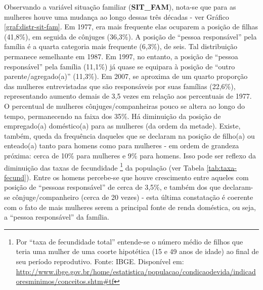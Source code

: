 Observando a variável situação familiar (\textbf{SIT_FAM}), nota-se que para as mulheres houve uma mudança ao longo dessas três décadas - ver Gráfico \ref{graf:distr-sit-fam}. Em 1977, era mais frequente elas ocuparem a posição de filhas (41,8\%), em seguida de cônjuges (36,3\%). A posição de ``pessoa responsável'' pela família é a quarta categoria mais frequente (6,3\%), de seis. Tal distribuição permanece semelhante em 1987. Em 1997, no entanto, a posição de ``pessoa responsável'' pela família (11,1\%) já quase se equipara à posição de ``outro parente/agregado(a)'' (11,3\%). Em 2007, se aproxima de um quarto proporção das mulheres entrevistadas que são responsáveis por suas famílias (22,6\%), representando aumento demais de 3,5 vezes em relação aos percentuais de 1977. O percentual de mulheres cônjuges/companheiras pouco se altera ao longo do tempo, permanecendo na faixa dos 35\%. Há diminuição da posição de empregado(a) doméstico(a) para as mulheres (da ordem da metade). Existe, também, queda da frequência daqueles que se declaram na posição de filho(a) ou enteado(a) tanto para homens como para mulheres - em ordem de grandeza próxima: cerca de 10\% para mulheres e 9\% para homens. Isso pode ser reflexo da diminuição das taxas de fecundidade%
\footnote{Por ``taxa de fecundidade total'' entende-se o número médio de filhos que teria uma mulher de uma coorte hipotética (15 e 49 anos de idade) ao final de seu período reprodutivo. Fonte: IBGE. Disponível em: \url{http://www.ibge.gov.br/home/estatistica/populacao/condicaodevida/indicadoresminimos/conceitos.shtm\#tf}} 
da população (ver Tabela \ref{tab:taxa-fecund}). Entre os homens percebe-se que houve crescimento entre aqueles com posição de ``pessoas responsável'' de cerca de 3,5\%, e também dos que declaram-se cônjuge/companheiro (cerca de 20 vezes) - esta última constatação é coerente com o fato de mais mulheres serem a principal fonte de renda doméstica, ou seja, a ``pessoa responsável'' da família.

